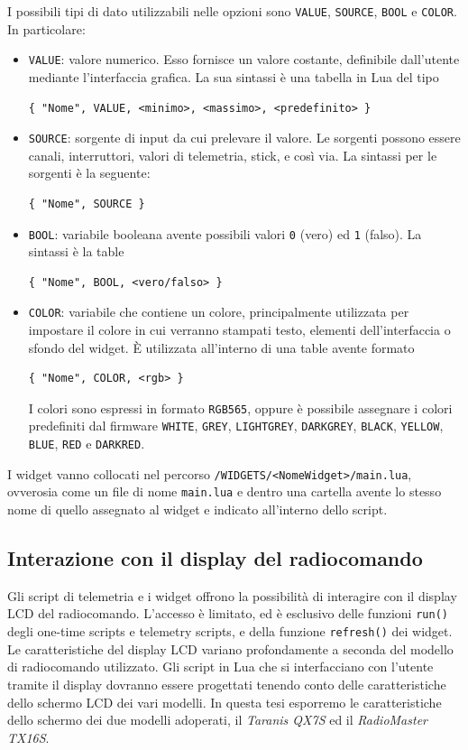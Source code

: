 \documentclass[a4paper, 12pt]{report}
\begin{document}
I possibili tipi di dato utilizzabili nelle opzioni sono \texttt{VALUE}, \texttt{SOURCE}, \texttt{BOOL} e \texttt{COLOR}. In particolare:
\begin{itemize}
        \item \texttt{VALUE}: valore numerico. Esso fornisce un valore costante, definibile dall'utente mediante l'interfaccia grafica. La sua sintassi è una tabella in Lua del tipo 
\begin{lstlisting} 
{ "Nome", VALUE, <minimo>, <massimo>, <predefinito> }
\end{lstlisting}
        \item \texttt{SOURCE}: sorgente di input da cui prelevare il valore. Le sorgenti possono essere canali, interruttori, valori di telemetria, stick, e così via. La sintassi per le sorgenti è la seguente: 
\begin{lstlisting} 
{ "Nome", SOURCE } 
\end{lstlisting}
        \item \texttt{BOOL}: variabile booleana avente possibili valori \texttt{0} (vero) ed \texttt{1} (falso). La sintassi è la table 
\begin{lstlisting}
{ "Nome", BOOL, <vero/falso> }
\end{lstlisting}
        \item \texttt{COLOR}: variabile che contiene un colore, principalmente utilizzata per impostare il colore in cui verranno stampati testo, elementi dell'interfaccia o sfondo del widget. È utilizzata all'interno di una table avente formato 
\begin{lstlisting} 
{ "Nome", COLOR, <rgb> } 
\end{lstlisting} 
        I colori sono espressi in formato \texttt{RGB565}, oppure è possibile assegnare i colori predefiniti dal firmware \texttt{WHITE}, \texttt{GREY}, \texttt{LIGHTGREY}, \texttt{DARKGREY}, \texttt{BLACK}, \texttt{YELLOW}, \texttt{BLUE}, \texttt{RED} e \texttt{DARKRED}.
\end{itemize}

I widget vanno collocati nel percorso \texttt{/WIDGETS/<NomeWidget>/main.lua}, ovverosia come un file di nome \texttt{main.lua} e dentro una cartella avente lo stesso nome di quello assegnato al widget e indicato all'interno dello script.

\subsection{Interazione con il display del radiocomando}
Gli script di telemetria e i widget offrono la possibilità di interagire con il display LCD del radiocomando. L'accesso è limitato, ed è esclusivo delle funzioni \texttt{run()} degli one-time scripts e telemetry scripts, e della funzione \texttt{refresh()} dei widget.
Le caratteristiche del display LCD variano profondamente a seconda del modello di radiocomando utilizzato. Gli script in Lua che si interfacciano con l'utente tramite il display dovranno essere progettati tenendo conto delle caratteristiche dello schermo LCD dei vari modelli. In questa tesi esporremo le caratteristiche dello schermo dei due modelli adoperati, il \emph{Taranis QX7S} ed il \emph{RadioMaster TX16S}. 
\end{document}
